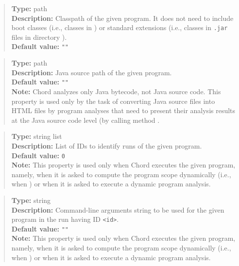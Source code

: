 \noindent {}
\begin{quote}
{\bf Type:} path \\
{\bf Description:} Classpath of the given program.  It does not need to include
boot classes (i.e., classes in ) or
standard extensions (i.e., classes in {\tt .jar} files in directory
). \\
{\bf Default value:} {\tt ""}
\end{quote}

\noindent {}
\begin{quote}
{\bf Type:} path \\
{\bf Description:} Java source path of the given program. \\
{\bf Default value:} {\tt ""} \\
{\bf Note:} Chord analyzes only Java bytecode, not Java source code.  This property is used only by the task of converting Java source files into HTML files by program analyses that need to present their analysis results at the Java source code level (by calling method .
\end{quote}

\noindent {}
\begin{quote}
{\bf Type:} string list \\
{\bf Description:} List of IDs to identify runs of the given program. \\
{\bf Default value:} {\tt 0} \\
{\bf Note:} This property is used only when Chord executes the given program, namely, when it is asked to compute the program scope dynamically (i.e., when ) or when it is asked to execute a dynamic program analysis. 
\end{quote}

\noindent {}
\begin{quote}
{\bf Type:} string \\
{\bf Description:} Command-line arguments string to be used for the given program in the run having ID {\tt <id>}. \\
{\bf Default value:} {\tt ""} \\
{\bf Note:} This property is used only when Chord executes the given program, namely, when it is asked to compute the program scope dynamically (i.e., when ) or when it is asked to execute a dynamic program analysis.
\end{quote}

